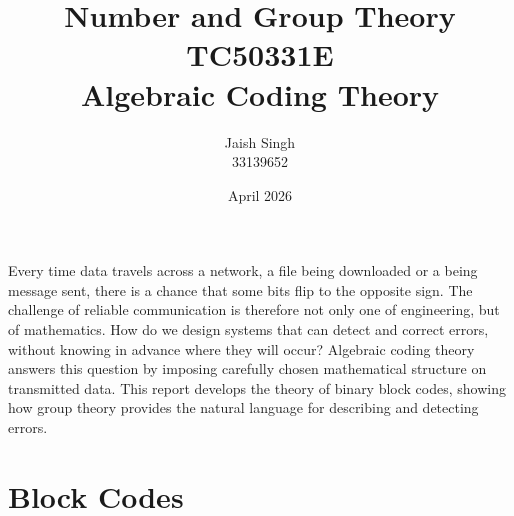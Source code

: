 \documentclass{article}
\title{Number and Group Theory\\\textbf{TC50331E}\\Algebraic Coding Theory}
\author{Jaish Singh\\33139652}
\date{April 2026}
\begin{document}
\maketitle
\setlength{\parskip}{0.5cm}

Every time data travels across a network, a file being downloaded or a being message sent, there is 
a chance that some bits flip to the opposite sign. The challenge of reliable communication is therefore 
not only one of engineering, but of mathematics. How do we design systems that can detect and correct 
errors, without knowing in advance where they will occur? Algebraic coding theory answers this question 
by imposing carefully chosen mathematical structure on transmitted data. This report develops the theory 
of binary block codes, showing how group theory provides the natural language for describing and 
detecting errors.

\section{Block Codes}
\end{document}
